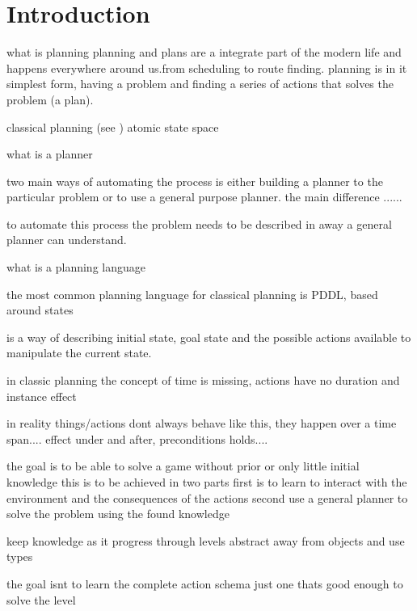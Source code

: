\section{Introduction}
	
	what is planning
	planning and plans are a integrate part of the modern life and happens everywhere around us.from scheduling to route finding. planning is in it simplest form, having a problem and finding a series of actions that solves the problem (a plan). 
	
	
	classical planning (see \cite{russell2014a})
	atomic state space 
	
	
	what is a planner	

	two main ways of automating the process is either building a planner to the particular problem or to use a general purpose planner. the main difference ......
	 
	  
	to automate this process the problem needs to be described in away a general planner can understand. 

	what is a planning language 

	the most common planning language for classical planning is PDDL, based around states  
	
	is a way of describing initial state, goal state and the possible actions available to manipulate the current state.
		
	


	in classic planning  the concept of time is missing, actions have no duration and instance effect

	in reality things/actions dont always behave like this, they happen over a time span.... effect under and after, preconditions holds....


	the goal is to be able to solve a game without prior or only little initial knowledge
	this is to be achieved in two parts
	first is to learn to interact with the environment and the consequences of the actions 
	second use a general planner to solve the problem using the found knowledge
	
	keep knowledge as it progress through levels
	abstract away from objects and use types
	
	the goal isnt to learn the complete action schema just one thats good enough to solve the level


